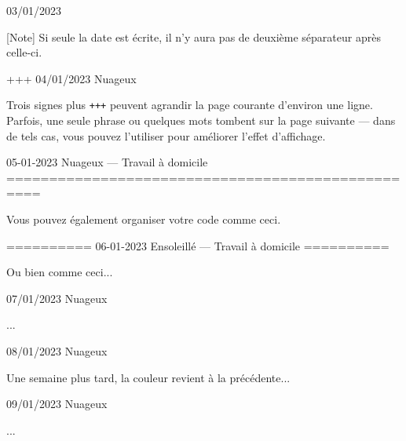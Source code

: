 \documentclass[11pt, paperstyle=light yellow, color entry, day-month-year,
  title in boldface, title in sffamily, use style = classical]{jwjournal}
\begin{document}
03/01/2023

  [Note] Si seule la date est écrite, il n'y aura pas de deuxième séparateur après celle-ci.


+++
04/01/2023  Nuageux

  Trois signes plus \texttt{+++} peuvent agrandir la page courante d'environ une ligne. Parfois, une seule phrase ou quelques mots tombent sur la page suivante --- dans de tels cas, vous pouvez l'utiliser pour améliorer l'effet d'affichage.



05-01-2023    Nuageux       --- Travail à domicile
==================================================

Vous pouvez également organiser votre code comme ceci.


==========
06-01-2023    Ensoleillé    --- Travail à domicile
==========

Ou bien comme ceci...



07/01/2023  Nuageux

  ...



08/01/2023  Nuageux

  Une semaine plus tard, la couleur revient à la précédente...



09/01/2023  Nuageux

  ...
\end{document}
